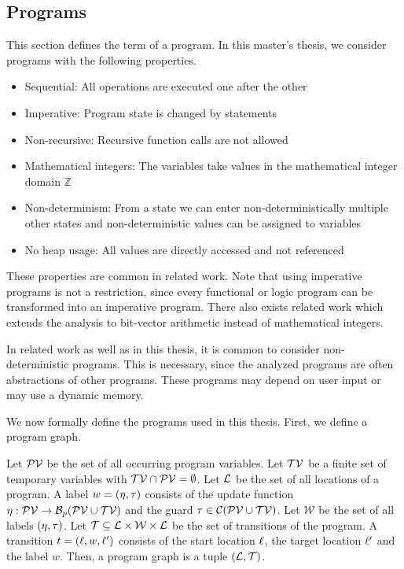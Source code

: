 \subsection{Programs}

This section defines the term of a program.
In this master's thesis, we consider programs with the following properties.

\begin{itemize}
\item Sequential: All operations are executed one after the other
\item Imperative: Program state is changed by statements
\item Non-recursive: Recursive function calls are not allowed
\item Mathematical integers: The variables take values in the mathematical integer domain $\mathbb{Z}$
\item Non-determinism: From a state we can enter non-deterministically multiple other states and non-deterministic values can be assigned to variables
\item No heap usage: All values are directly accessed and not referenced
\end{itemize}

These properties are common in related work.
Note that using imperative programs is not a restriction, since every functional or logic program can be transformed into an imperative program. \cite{equivalence_of_languages}
There also exists related work which extends the analysis to bit-vector arithmetic instead of mathematical integers. \cite{bitvectorarithmetic}

In related work as well as in this thesis, it is common to consider non-deterministic programs.
This is necessary, since the analyzed programs are often abstractions of other programs.
These programs may depend on user input or may use a dynamic memory.

We now formally define the programs used in this thesis.
First, we define a program graph.

\begin{definition} 
  Let $\mathcal{PV}$ be the set of all occurring program variables.
  Let $\mathcal{TV}$ be a finite set of temporary variables with $\mathcal{TV} \cap \mathcal{PV} = \emptyset$.
  Let $\mathcal{L}$ be the set of all locations of a program.
  A label $w = (\eta, \tau)$ consists of the update function $\eta: \mathcal{PV} \rightarrow \mathcal{B}_p(\mathcal{PV} \cup \mathcal{TV})$ and the guard $\tau \in \mathcal{C}(\mathcal{PV} \cup \mathcal{TV})$.
  Let $\mathcal{W}$ be the set of all labels $(\eta, \tau)$.
  Let $\mathcal{T} \subseteq \mathcal{L} \times \mathcal{W} \times \mathcal{L}$ be the set of transitions of the program.
  A transition $t = (\ell, w, \ell')$ consists of the start location $\ell$, the target location $\ell'$ and the label $w$.
  Then, a program graph is a tuple $(\mathcal{L}, \mathcal{T})$.
\end{definition}

